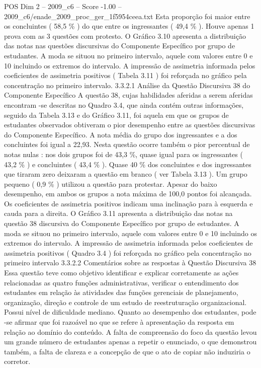 \begin{textsample}{POS Dim 2 – 2009\_c6 – Score -1.00 – 2009\_c6/enade\_2009\_proc\_ger\_1f5954ceea.txt}
Esta proporção foi maior entre os concluintes ( 58,5 \% ) do que entre os ingressantes ( 49,4 \% ).
Houve apenas 1 prova com as 3 questões com protesto.
O Gráfico 3.10 apresenta a distribuição das notas nas questões discursivas do Componente Específico por grupo de estudantes.
A moda se situou no primeiro intervalo, aquele com valores entre 0 e 10 incluindo os extremos do intervalo.
A impressão de assimetria informada pelos coeficientes de assimetria positivos ( Tabela 3.11 ) foi reforçada no gráfico pela concentração no primeiro intervalo. 3.3.2.1 Análise da Questão Discursiva 38 do Componente Específico A questão 38, cujas habilidades aferidas a serem aferidas encontram -se descritas no Quadro 3.4, que ainda contém outras informações, seguido da Tabela 3.13 e do Gráfico 3.11, foi aquela em que os grupos de estudantes observados obtiveram o pior desempenho entre as questões discursivas do Componente Específico.
A nota média do grupo dos ingressantes e a dos concluintes foi igual a 22,93.
Nesta questão ocorre também o pior percentual de notas nulas : nos dois grupos foi de 43,3 \%, quase igual para os ingressantes ( 43,2 \% ) e concluintes ( 43,4 \% ).
Quase 40 \% dos concluintes e dos ingressantes que tiraram zero deixaram a questão em branco ( ver Tabela 3.13 ).
Um grupo pequeno ( 0,9 \% ) utilizou a questão para protestar.
Apesar do baixo desempenho, em ambos os grupos a nota máxima de 100,0 pontos foi alcançada.
Os coeficientes de assimetria positivos indicam uma inclinação para à esquerda e cauda para a direita.
O Gráfico 3.11 apresenta a distribuição das notas na questão 38 discursiva do Componente Específico por grupo de estudantes.
A moda se situou no primeiro intervalo, aquele com valores entre 0 e 10 incluindo os extremos do intervalo.
A impressão de assimetria informada pelos coeficientes de assimetria positivos ( Quadro 3.4 ) foi reforçada no gráfico pela concentração no primeiro intervalo 3.3.2.2 Comentários sobre as respostas à Questão Discursiva 38 Essa questão teve como objetivo identificar e explicar corretamente as ações relacionadas as quatro funções administrativas, verificar o entendimento dos estudantes em relação às atividades das funções gerenciais de planejamento, organização, direção e controle de um estudo de reestruturação organizacional.
Possui nível de dificuldade mediano.
Quanto ao desempenho dos estudantes, pode -se afirmar que foi razoável no que se refere à apresentação da resposta em relação ao domínio do conteúdo.
A falta de compreensão do foco da questão levou um grande número de estudantes apenas a repetir o enunciado, o que demonstrou também, a falta de clareza e a concepção de que o ato de copiar não induziria o corretor.

\end{textsample}
